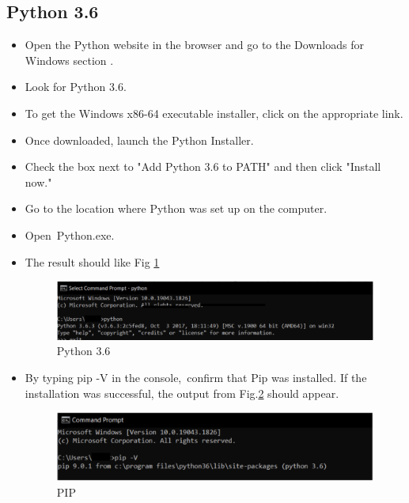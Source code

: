 \documentclass[10pt]{article}
\begin{document}
\subsection{Python 3.6}
\begin{itemize}
    \item Open the Python website in the browser and go to the Downloads for Windows section \cite{4}.
\item Look for Python 3.6.
\item To get the Windows x86-64 executable installer, click on the appropriate link.
\item Once downloaded, launch the Python Installer.
\item Check the box next to "Add Python 3.6 to PATH" and then click "Install now."
\item Go to the location where Python was set up on the computer.
\item Open Python.exe.
\item The result should like Fig \ref{fig:py}
\begin{figure}[H]
    \begin{center}
        \includegraphics[width=0.7\linewidth, frame]{CA2-template/CM6.png}
       \caption{Python 3.6 \label{fig:py}}
    \end{center}
\end{figure}

\item By typing pip -V in the console, confirm that Pip was installed. If the installation was successful, the output from Fig.\ref{fig:pip} should appear.
\begin{figure}[H]
    \begin{center}
        \includegraphics[width=0.7\linewidth, frame]{CA2-template/CM5.png}
       \caption{PIP \label{fig:pip}}
    \end{center}
\end{figure}

\end{itemize}
\end{document}
